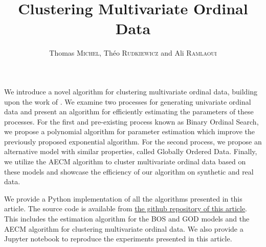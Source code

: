 \documentclass{ipol}
\title{Clustering Multivariate Ordinal Data}
\author{Thomas \textsc{Michel}, Théo \textsc{Rudkiewicz} and Ali \textsc{Ramlaoui}}
\begin{document}
\tableofcontents

\begin{ipolAbstract}
    We introduce a novel algorithm for clustering multivariate ordinal data, building upon the work of \cite{biernacki2016model}. We examine two processes for generating univariate ordinal data and present an algorithm for efficiently estimating the parameters of these processes. For the first and pre-existing process known as Binary Ordinal Search, we propose a polynomial algorithm for parameter estimation which improve the previously proposed exponential algorithm. For the second process, we propose an alternative model with similar properties, called Globally Ordered Data. Finally, we utilize the AECM algorithm to cluster multivariate ordinal data based on these models and showcase the efficiency of our algorithm on synthetic and real data.
\end{ipolAbstract}

\begin{ipolCode}
    We provide a Python implementation of all the algorithms presented in this article. The source code is available from \href{https://github.com/Thomick/Ordinal-data-clustering}{the github repository of this article}. This includes the estimation algorithm for the BOS and GOD models and the AECM algorithm for clustering multivariate ordinal data.
    We also provide a Jupyter notebook to reproduce the experiments presented in this article. 
\end{ipolCode}






















\appendix







\label{appendix:god}




\end{document}

